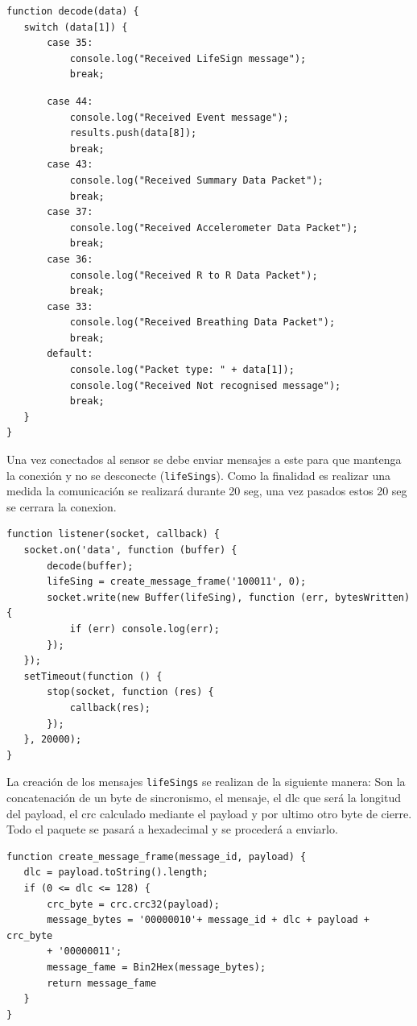 \begin{verbatim}
function decode(data) {
   switch (data[1]) {
       case 35:
           console.log("Received LifeSign message");
           break;
           \end{verbatim}
           \begin{verbatim}
       case 44:
           console.log("Received Event message");
           results.push(data[8]);
           break;
       case 43:
           console.log("Received Summary Data Packet");
           break;
       case 37:
           console.log("Received Accelerometer Data Packet");
           break;
       case 36:
           console.log("Received R to R Data Packet");
           break;
       case 33:
           console.log("Received Breathing Data Packet");
           break;
       default:
           console.log("Packet type: " + data[1]);
           console.log("Received Not recognised message");
           break;
   }
}
\end{verbatim}

Una vez conectados al sensor se debe enviar mensajes a este para que mantenga la conexión y no se desconecte (\texttt{lifeSings}). Como la finalidad es realizar una medida la comunicación se realizará durante 20 seg, una vez pasados estos 20 seg se cerrara la conexion. 

\begin{verbatim}
function listener(socket, callback) {
   socket.on('data', function (buffer) {
       decode(buffer);
       lifeSing = create_message_frame('100011', 0);
       socket.write(new Buffer(lifeSing), function (err, bytesWritten) {
           if (err) console.log(err);
       });
   });
   setTimeout(function () {
       stop(socket, function (res) {
           callback(res);
       });
   }, 20000);
}
\end{verbatim}

La creación de los mensajes \texttt{lifeSings} se realizan de la siguiente manera: Son la concatenación de un byte de sincronismo, el mensaje, el dlc que será la longitud del payload, el crc calculado mediante el payload y por ultimo otro byte de cierre. Todo el paquete se pasará a hexadecimal y se procederá a enviarlo.
 \pagebreak
\begin{verbatim}
function create_message_frame(message_id, payload) {
   dlc = payload.toString().length;
   if (0 <= dlc <= 128) {
       crc_byte = crc.crc32(payload);
       message_bytes = '00000010'+ message_id + dlc + payload + crc_byte 
       + '00000011';
       message_fame = Bin2Hex(message_bytes);
       return message_fame
   }
}
\end{verbatim}

